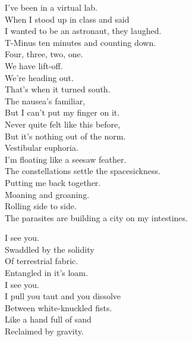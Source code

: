 
I've been  in a virtual lab. \\
When I stood up in class and said \\
I wanted to be an astronaut, they laughed. \\
T-Minus ten minutes and counting down. \\
Four, three, two, one. \\
We have lift-off. \\
We're heading out. \\
That's when it turned south. \\

The nausea's familiar, \\
But I can't put my finger on it. \\
Never quite felt like this before, \\
But it's nothing out of the norm. \\
Vestibular euphoria. \\
I'm floating like a seesaw feather. \\
The constellations settle the spacesickness. \\
Putting me back together. \\

Moaning and groaning. \\
Rolling side to side. \\
The parasites are building a city on my intestines. \\


I see you. \\
Swaddled by the solidity \\
Of terrestrial fabric. \\
Entangled in it's loam. \\

I see you. \\
I pull you taut and you dissolve \\
Between white-knuckled fists. \\
Like a hand full of sand \\
Reclaimed by gravity. \\


